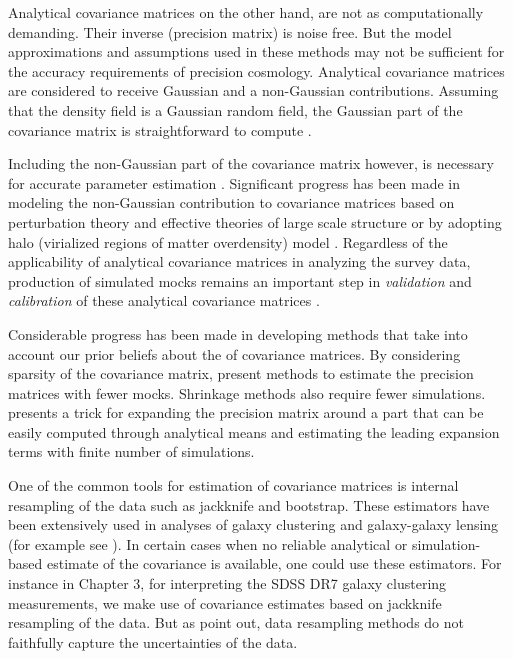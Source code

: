 Analytical covariance matrices on the other hand, are not as computationally demanding. 
Their inverse (precision matrix) is noise free. But the model approximations and assumptions used in these methods may not be sufficient for the accuracy requirements of precision cosmology. Analytical covariance matrices are considered to receive Gaussian and a non-Gaussian contributions. Assuming that the density field is a 
Gaussian random field, the Gaussian part of the covariance matrix is straightforward to compute \citep{grieb2016,klaus2016,slepian2016b}.

Including the non-Gaussian part of the covariance matrix however, is necessary for accurate parameter estimation \citep{takahashi2011,blot2016,chan2016}.
Significant progress has been made in modeling the non-Gaussian contribution to covariance matrices based on perturbation theory and effective theories of large scale structure \citep{mohammed_seljak,mohammed2017} or by adopting halo (virialized regions of matter overdensity) model \citep{takada_spergel,eifler2014}.
Regardless of the applicability of analytical covariance matrices in analyzing the survey data, production of simulated mocks remains an important step in \emph{validation} and \emph{calibration} of these analytical covariance matrices \citep{slepian2016b,hildebrandt2017}.

Considerable progress has been made in developing methods that take into account our prior beliefs 
about the of covariance matrices. By considering sparsity of the covariance matrix, \citet{paz2015,padmanabhan2016} 
present methods to estimate the precision matrices with fewer mocks. Shrinkage methods \citep{pope2008,joachimi2016} 
also require fewer simulations. \citet{fried2017} presents a trick for expanding the precision matrix 
around a part that can be easily computed through analytical means and estimating the leading expansion terms with finite number of simulations.

One of the common tools for estimation of covariance matrices is internal resampling of the data such as jackknife and bootstrap. These estimators have been extensively used in analyses of galaxy clustering and galaxy-galaxy lensing (for example see \citealt{reid2014,hod_vs_sham,shirasaki2016,singh2016,kwan2017}).
In certain cases when no reliable analytical or simulation-based estimate of the covariance is available, one could use these estimators. 
For instance in Chapter 3, for interpreting the SDSS DR7 galaxy clustering measurements, 
we make use of covariance estimates based on jackknife resampling of the data. But as \citet{norberg,fried2016} point out, data resampling methods do not faithfully capture the uncertainties of the data. 

